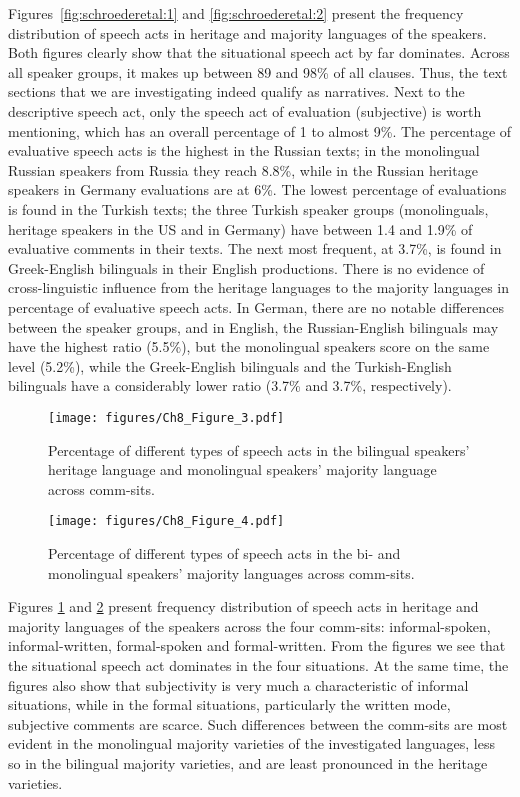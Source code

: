 \documentclass[output=paper,colorlinks,citecolor=brown]{langscibook}
\begin{document}
Figures~\ref{fig:schroederetal:1}  and \ref{fig:schroederetal:2} present the frequency distribution of speech acts in heritage and majority languages of the speakers. Both figures clearly show that the situational speech act by far dominates. Across all speaker groups, it makes up between 89 and 98\% of all clauses. Thus, the text sections that we are investigating indeed qualify as narratives. Next to the descriptive speech act, only the speech act of evaluation (subjective) is worth mentioning, which has an overall percentage of 1 to almost 9\%. The percentage of evaluative speech acts is the highest in the Russian texts; in the monolingual Russian speakers from Russia they reach 8.8\%, while in the Russian heritage speakers in Germany evaluations are at 6\%. The lowest percentage of evaluations is found in the Turkish texts; the three Turkish speaker groups (monolinguals, heritage speakers in the US and in Germany) have between 1.4 and 1.9\% of evaluative comments in their texts. The next most frequent, at 3.7\%, is found in Greek-English bilinguals in their English productions. There is no evidence of cross-linguistic influence from the heritage languages to the majority languages in percentage of evaluative speech acts. In German, there are no notable differences between the speaker groups, and in English, the Russian-English bilinguals may have the highest ratio (5.5\%), but the monolingual speakers score on the same level (5.2\%), while the Greek-English bilinguals and the Turkish-English bilinguals have a considerably lower ratio (3.7\% and 3.7\%, respectively). 

\begin{figure}
    \centering
    \texttt{[image: figures/Ch8\_Figure\_3.pdf]}
    \caption{Percentage of different types of speech acts in the bilingual speakers’ heritage language and monolingual speakers’ majority language across comm-sits.}
    \label{fig:schroederetal:3}
\end{figure}

\begin{figure}
    \centering
    \texttt{[image: figures/Ch8\_Figure\_4.pdf]}
    \caption{Percentage of different types of speech acts in the bi- and monolingual speakers’ majority languages across comm-sits.}
    \label{fig:schroederetal:4}
\end{figure}
\largerpage
Figures \ref{fig:schroederetal:3} and \ref{fig:schroederetal:4} present frequency distribution of speech acts in heritage and majority languages of the speakers across the four comm-sits: informal-spoken, informal-written, formal-spoken and formal-written. From the figures we see that the situational speech act dominates in the four situations. At the same time, the figures also show that subjectivity is very much a characteristic of informal situations, while in the formal situations, particularly the written mode, subjective comments are scarce. Such differences between the comm-sits are most evident in the monolingual majority varieties of the investigated languages, less so in the bilingual majority varieties, and are least pronounced in the heritage varieties.
\end{document}

